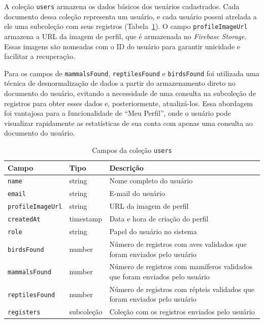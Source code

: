 A coleção \texttt{users} armazena os dados básicos dos usuários cadastrados. Cada documento dessa coleção representa um usuário, e cada usuário possui atrelada a ele uma subcoleção com seus registros (Tabela~\ref{tab:firestore-users}). O campo \texttt{profileImageUrl} armazena a URL da imagem de perfil, que é armazenada no \textit{Firebase Storage}. Essas imagens são nomeadas com o ID do usuário para garantir unicidade e facilitar a recuperação.

Para os campos de \texttt{mammalsFound}, \texttt{reptilesFound} e \texttt{birdsFound} foi utilizada uma técnica de desnormalização de dados a partir do armazenamento direto no documento do usuário, evitando a necessidade de uma consulta na subcoleção de registros para obter esses dados e, posteriormente, atualizá-los.
Essa abordagem foi vantajosa para a funcionalidade de ``Meu Perfil'', onde o usuário pode visualizar rapidamente as estatísticas de sua conta com apenas uma consulta ao documento do usuário.

\begin{table}[H]
    \centering
    \caption{Campos da coleção \texttt{users}}
    \label{tab:firestore-users}
    \begin{tabular}{|>{\raggedright\arraybackslash}p{3.5cm}|
                    >{\raggedright\arraybackslash}p{2cm}|
                    >{\raggedright\arraybackslash}p{7cm}|}
        \hline
        \textbf{Campo} & \textbf{Tipo} & \textbf{Descrição} \\ \hline
        \texttt{name} & string & Nome completo do usuário \\ \hline
        \texttt{email} & string & E-mail do usuário \\ \hline
        \texttt{profileImageUrl} & string & URL da imagem de perfil \\ \hline
        \texttt{createdAt} & timestamp & Data e hora de criação do perfil \\ \hline
        \texttt{role} & string & Papel do usuário no sistema \\ \hline
        \texttt{birdsFound} & number & Número de registros com aves validados que foram enviados pelo usuário \\ \hline
        \texttt{mammalsFound} & number & Número de registros com mamíferos validados que foram enviados pelo usuário \\ \hline
        \texttt{reptilesFound} & number & Número de registros com répteis validados que foram enviados pelo usuário \\ \hline
        \texttt{registers} & subcoleção & Coleção com os registros enviados pelo usuário \\ \hline
    \end{tabular}
\end{table}


